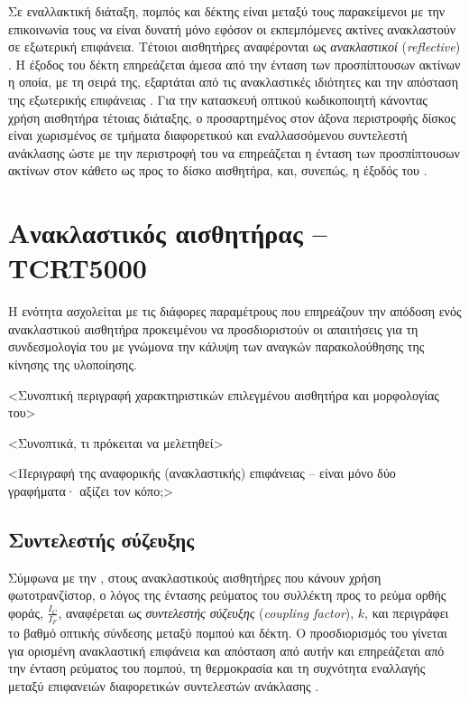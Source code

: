Σε εναλλακτική διάταξη, πομπός και δέκτης είναι μεταξύ τους παρακείμενοι με την
επικοινωνία τους να είναι δυνατή μόνο εφόσον οι εκπεμπόμενες ακτίνες ανακλαστούν
σε εξωτερική επιφάνεια. Τέτοιοι αισθητήρες αναφέρονται ως \emph{ανακλαστικοί}
 (\emph{reflective}) \parencite[3]{lynch02}.
Η έξοδος του δέκτη επηρεάζεται άμεσα από την ένταση των προσπίπτουσων ακτίνων η
οποία, με τη σειρά της, εξαρτάται από τις ανακλαστικές ιδιότητες και την
απόσταση της εξωτερικής επιφάνειας \parencite{vishay06}. Για την κατασκευή
οπτικού κωδικοποιητή κάνοντας χρήση αισθητήρα τέτοιας διάταξης, ο προσαρτημένος
στον άξονα περιστροφής δίσκος είναι χωρισμένος σε τμήματα διαφορετικού και
εναλλασσόμενου συντελεστή ανάκλασης ώστε με την περιστροφή του να επηρεάζεται η
ένταση των προσπίπτουσων ακτίνων στον κάθετο ως προς το δίσκο αισθητήρα, και,
συνεπώς, η έξοδός του \parencite[11]{vishay02}.

\section{Ανακλαστικός αισθητήρας -- TCRT5000}

Η ενότητα ασχολείται με τις διάφορες παραμέτρους που επηρεάζουν την απόδοση ενός
ανακλαστικού αισθητήρα προκειμένου να προσδιοριστούν οι απαιτήσεις για τη
συνδεσμολογία του με γνώμονα την κάλυψη των αναγκών παρακολούθησης της κίνησης
της υλοποίησης.

<Συνοπτική περιγραφή χαρακτηριστικών επιλεγμένου αισθητήρα και μορφολογίας του>

<Συνοπτικά, τι πρόκειται να μελετηθεί>

<Περιγραφή της αναφορικής (ανακλαστικής) επιφάνειας -- είναι μόνο δύο γραφήματα·
αξίζει τον κόπο;>

\subsection{Συντελεστής σύζευξης}

Σύμφωνα με την \textcite{vishay02}, στους ανακλαστικούς αισθητήρες που κάνουν
χρήση φωτοτρανζίστορ, ο λόγος της έντασης ρεύματος του συλλέκτη προς το ρεύμα
ορθής φοράς, $\frac{I_{C}}{I_{F}}$, αναφέρεται ως \emph{συντελεστής σύζευξης}
 (\emph{coupling factor}), $k$, και περιγράφει το
βαθμό οπτικής σύνδεσης μεταξύ πομπού και δέκτη.
Ο προσδιορισμός του γίνεται για ορισμένη ανακλαστική επιφάνεια και απόσταση από
αυτήν και επηρεάζεται από την ένταση ρεύματος του πομπού, τη θερμοκρασία και τη
συχνότητα εναλλαγής μεταξύ επιφανειών διαφορετικών συντελεστών ανάκλασης
\parencite{vishay02}.

